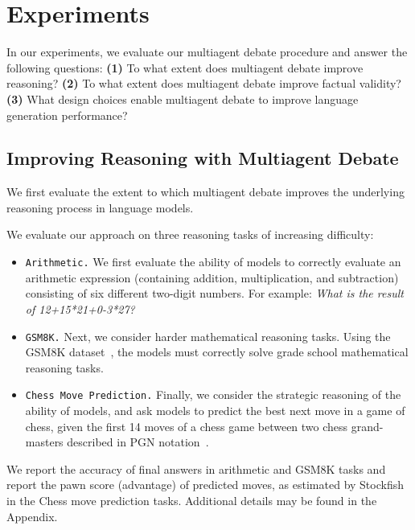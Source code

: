 \vspace{-8pt}
\section{Experiments}
\vspace{-3pt}

In our experiments, we evaluate our multiagent debate procedure and answer the following questions: \textbf{(1)} To what extent does multiagent debate improve reasoning? \textbf{(2)} To what extent does multiagent debate improve factual validity? \textbf{(3)}  What design choices enable multiagent debate to improve language generation performance? 








\vspace{-5pt}
\subsection{Improving Reasoning with Multiagent Debate}
\label{sect:reasoning}

We first evaluate the extent to which multiagent debate improves the underlying reasoning process in language models.

 We evaluate our approach on three reasoning tasks of increasing difficulty:
\vspace{-3pt}
\begin{itemize}[leftmargin=*, nosep]
    \item \texttt{Arithmetic.} We first evaluate the ability of models to correctly evaluate an arithmetic expression (containing addition, multiplication, and subtraction) consisting of six different two-digit numbers. For example: {\it What is the result of 12+15*21+0-3*27?} 
    \item \texttt{GSM8K.} Next, we consider harder mathematical reasoning tasks. Using the GSM8K dataset~\cite{verifier}, the models must correctly solve grade school mathematical reasoning tasks. 
    \item \texttt{Chess Move Prediction.} Finally, we consider the strategic reasoning of the ability of models, and ask models to predict the best next move in a game of chess, given the first 14 moves of a chess game between two chess grand-masters described in PGN notation~\cite{Fsmosca}. 
\end{itemize}
We report the accuracy of final answers in arithmetic and GSM8K tasks and report the pawn score (advantage) of predicted moves, as estimated by Stockfish in the Chess move prediction tasks. Additional details may be found in the Appendix.


